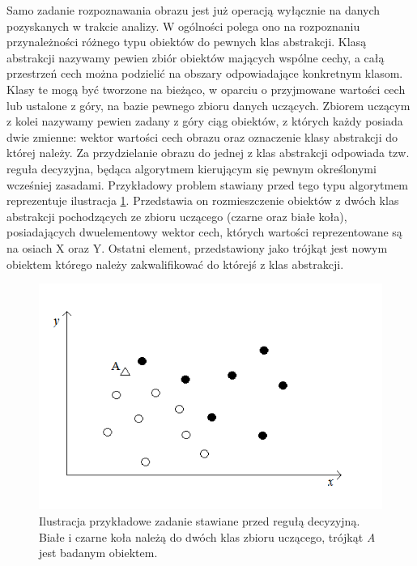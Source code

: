 Samo zadanie rozpoznawania obrazu jest już operacją wyłącznie na danych pozyskanych w trakcie analizy. W ogólności polega ono na rozpoznaniu przynależności różnego typu obiektów do pewnych klas abstrakcji\cite{Tadeusiewicz_flasinski}. Klasą abstrakcji nazywamy pewien zbiór obiektów mających wspólne cechy, a całą przestrzeń cech można podzielić na obszary odpowiadające konkretnym klasom. Klasy te mogą być tworzone na bieżąco, w oparciu o przyjmowane wartości cech lub ustalone z góry, na bazie pewnego zbioru danych uczących. Zbiorem uczącym z kolei nazywamy pewien zadany z góry ciąg obiektów, z których każdy posiada dwie zmienne: wektor wartości cech obrazu oraz oznaczenie klasy abstrakcji do której należy\cite{Materka}. Za przydzielanie obrazu do jednej z klas abstrakcji odpowiada tzw. reguła decyzyjna, będąca algorytmem kierującym się pewnym określonymi wcześniej zasadami. Przykładowy problem stawiany przed tego typu algorytmem reprezentuje ilustracja \ref{zbior}. Przedstawia on rozmieszczenie obiektów z dwóch klas abstrakcji pochodzących ze zbioru uczącego (czarne oraz białe koła), posiadających dwuelementowy wektor cech, których wartości reprezentowane są na osiach X oraz Y. Ostatni element, przedstawiony jako trójkąt jest nowym obiektem którego należy zakwalifikować do którejś z klas abstrakcji.

\begin{figure}[H]
\begin{center}
\includegraphics[scale=0.6]{imgs/hardtask2.png}
\caption[Przykładowe zadanie reguły decyzyjnej.]{\small{Ilustracja przykładowe zadanie stawiane przed regułą decyzyjną. Białe i czarne koła należą do dwóch klas zbioru uczącego, trójkąt \textit{A} jest badanym obiektem.}}
\label{zbior}
\end{center}
\end{figure}

